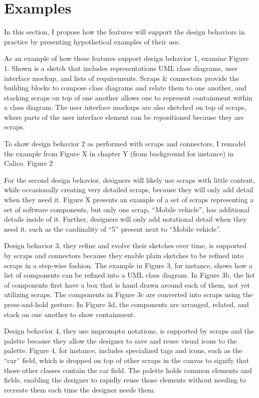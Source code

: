 \section{Examples}

In this section, I propose how the features will support the design behaviors in practice by presenting hypothetical examples of their use.

As an example of how these features support design behavior 1, examine Figure 1. Shown is a sketch that includes representations UML class diagrams, user interface mockup, and lists of requirements. Scraps \& connectors provide the building blocks to compose class diagrams and relate them to one another, and stacking scraps on top of one another allows one to represent containment within a class diagram. The user interface mockups are also sketched on top of scraps, where parts of the user interface element can be repositioned because they are scraps.

To show design behavior 2 as performed with scraps and connectors, I remodel the example from Figure X in chapter Y (from background for instance) in Calico.  Figure 2

For the second design behavior, designers will likely use scraps with little content, while occasionally creating very detailed scraps, because they will only add detail when they need it. Figure X presents an example of a set of scraps representing a set of software components, but only one scrap, ``Mobile vehicle'', has additional details inside of it. Further, designers will only add notational detail when they need it, such as the cardinality of ``5'' present next to ``Mobile vehicle''.

Design behavior 3, they refine and evolve their sketches over time, is supported by scraps and connectors because they enable plain sketches to be refined into scraps in a step-wise fashion. The example in Figure 3, for instance, shows how a list of components can be refined into a UML class diagram. In Figure 3b, the list of components first have a box that is hand drawn around each of them, not yet utilizing scraps. The components in Figure 3c are converted into scraps using the press-and-hold gesture. In Figure 3d, the components are arranged, related, and stack on one another to show containment. 
     
Design behavior 4, they use impromptu notations, is supported by scraps and the palette because they allow the designer to save and reuse visual icons to the palette. Figure 4, for instance, includes specialized tags and icons, such as the ``car'' field, which is dropped on top of other scraps in the canvas to signify that those other classes contain the car field. The palette holds common elements and fields, enabling the designer to rapidly reuse those elements without needing to recreate them each time the designer needs them.

